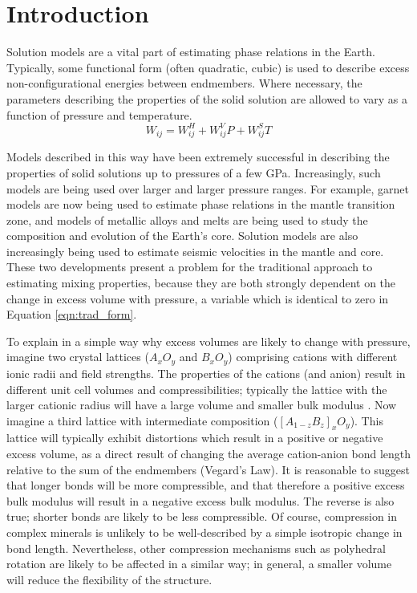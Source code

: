 \documentclass[review]{elsarticle}
\begin{document}
\linenumbers

\section{Introduction}

Solution models are a vital part of estimating phase relations in the Earth. Typically, some functional form (often quadratic, cubic) is used to describe excess non-configurational energies between endmembers. Where necessary, the parameters describing the properties of the solid solution are allowed to vary as a function of pressure and temperature. 
\begin{equation}
  W_{ij} = W_{ij}^H + W_{ij}^VP + W_{ij}^ST
  \label{eqn:trad_form}
\end{equation}

Models described in this way have been extremely successful in describing the properties of solid solutions up to pressures of a few GPa. Increasingly, such models are being used over larger and larger pressure ranges. For example, garnet models are now being used to estimate phase relations in the mantle transition zone, and models of metallic alloys and melts are being used to study the composition and evolution of the Earth's core. Solution models are also increasingly being used to estimate seismic velocities in the mantle and core. These two developments present a problem for the traditional approach to estimating mixing properties, because they are both strongly dependent on the change in excess volume with pressure, a variable which is identical to zero in Equation \ref{eqn:trad_form}.

To explain in a simple way why excess volumes are likely to change with pressure, imagine two crystal lattices ($A_xO_y$ and $B_xO_y$) comprising cations with different ionic radii and field strengths. The properties of the cations (and anion) result in different unit cell volumes and compressibilities; typically the lattice with the larger cationic radius will have a large volume and smaller bulk modulus \citep{AA1970}. Now imagine a third lattice with intermediate composition ($[A_{1-z}B_z]_xO_y$). This lattice will typically exhibit distortions which result in a positive or negative excess volume, as a direct result of changing the average cation-anion bond length relative to the sum of the endmembers (Vegard's Law). It is reasonable to suggest that longer bonds will be more compressible, and that therefore a positive excess bulk modulus will result in a negative excess bulk modulus. The reverse is also true; shorter bonds are likely to be less compressible. Of course, compression in complex minerals is unlikely to be well-described by a simple isotropic change in bond length. Nevertheless, other compression mechanisms such as polyhedral rotation are likely to be affected in a similar way; in general, a smaller volume will reduce the flexibility of the structure.
\end{document}
